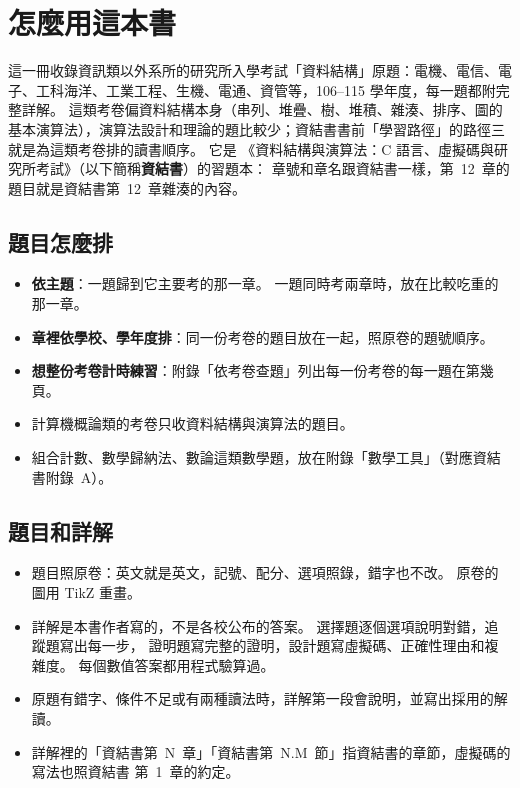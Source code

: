 \chapter*{怎麼用這本書}

這一冊收錄資訊類以外系所的研究所入學考試「資料結構」原題：電機、電信、電子、工科海洋、工業工程、生機、電通、資管等，106--115 學年度，每一題都附完整詳解。 這類考卷偏資料結構本身（串列、堆疊、樹、堆積、雜湊、排序、圖的基本演算法），演算法設計和理論的題比較少；資結書書前「學習路徑」的路徑三就是為這類考卷排的讀書順序。 它是
《資料結構與演算法：C 語言、虛擬碼與研究所考試》（以下簡稱\textbf{資結書}）的習題本：
章號和章名跟資結書一樣，第~12~章的題目就是資結書第~12~章雜湊的內容。

\section*{題目怎麼排}

\begin{itemize}
\item \textbf{依主題}：一題歸到它主要考的那一章。 一題同時考兩章時，放在比較吃重的那一章。
\item \textbf{章裡依學校、學年度排}：同一份考卷的題目放在一起，照原卷的題號順序。
\item \textbf{想整份考卷計時練習}：附錄「依考卷查題」列出每一份考卷的每一題在第幾頁。
\item 計算機概論類的考卷只收資料結構與演算法的題目。
\item 組合計數、數學歸納法、數論這類數學題，放在附錄「數學工具」（對應資結書附錄~A）。
\end{itemize}

\section*{題目和詳解}

\begin{itemize}
\item 題目照原卷：英文就是英文，記號、配分、選項照錄，錯字也不改。 原卷的圖用 TikZ 重畫。
\item 詳解是本書作者寫的，不是各校公布的答案。 選擇題逐個選項說明對錯，追蹤題寫出每一步，
證明題寫完整的證明，設計題寫虛擬碼、正確性理由和複雜度。 每個數值答案都用程式驗算過。
\item 原題有錯字、條件不足或有兩種讀法時，詳解第一段會說明，並寫出採用的解讀。
\item 詳解裡的「資結書第~N~章」「資結書第~N.M~節」指資結書的章節，虛擬碼的寫法也照資結書
第~1~章的約定。
\end{itemize}

